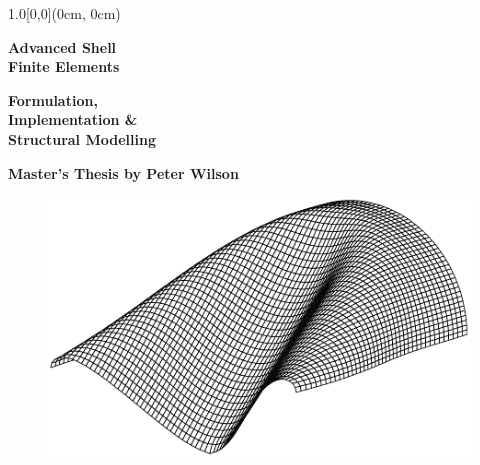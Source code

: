 \begin{textblock*}{1.0\textwidth}[0,0](0cm, 0cm)%
{\fontsize{50pt}{40pt}\selectfont\textbf{Advanced Shell \\ Finite Elements}\par}
{\fontsize{36pt}{30pt}\selectfont\textbf
	{\textcolor{gray75}{Formulation, \\ Implementation \& \\ Structural Modelling}}\par
}



{\fontsize{24pt}{26pt}\selectfont\textbf{\textcolor{TUMblue}{Master's Thesis by Peter Wilson}}}
\end{textblock*}

\vspace*{102.2mm}

\begin{figure}[H]
	\centering
	\def\svgwidth{\columnwidth}
	\includegraphics[width=\textwidth]{./Ressourcen/titleimage.pdf}
\end{figure}



